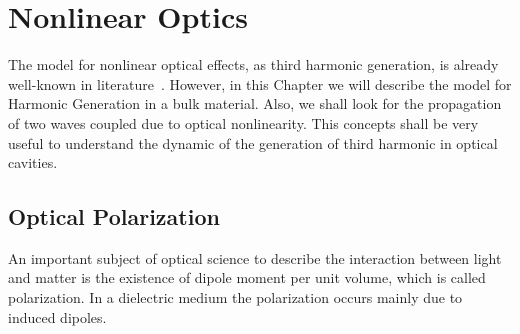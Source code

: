 \chapter{Nonlinear Optics}
\label{chap:2_nonlin_pol}
The model for nonlinear optical effects, as third harmonic generation, is already well-known in literature~\cite{Boyd2003}. However, in this Chapter we will describe the model for Harmonic Generation in a bulk material. Also, we shall look for the propagation of two waves coupled due to optical nonlinearity. This concepts shall be very useful to understand the dynamic of the generation of third harmonic in optical cavities.  

\section{Optical Polarization}
\label{sec:Optical_nonlinear}
An important subject of optical science to describe the interaction between light and matter is the existence of dipole moment per unit volume, which is called polarization. In a dielectric medium the polarization occurs mainly due to induced dipoles.


